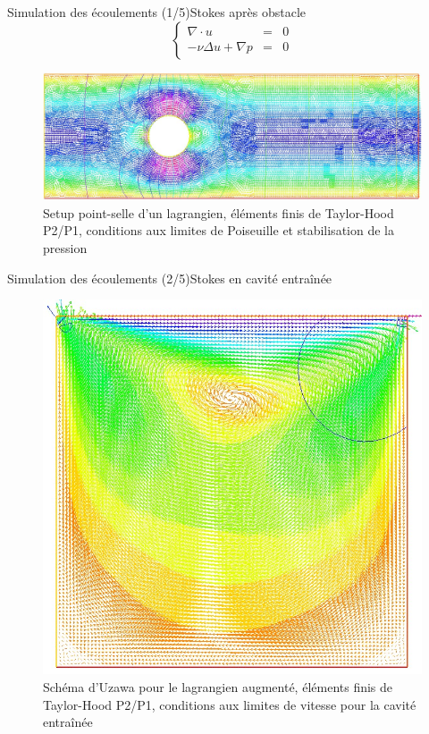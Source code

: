 \documentclass{beamer}
\begin{document}
\begin{frame}{Simulation des écoulements (1/5)}{Stokes après obstacle}
    \begin{equation*}
        \left\{
        \begin{array}{rcl}
        \nabla \cdot u & = & 0 \\
        -\nu \Delta u + \nabla p & = & 0
        \end{array}
        \right.
    \end{equation*}
    \begin{figure}
    \centering
        \includegraphics[width=\textwidth]{images/stokes_obstacle_centre.jpg}
        \caption{Setup point-selle d'un lagrangien, éléments finis de Taylor-Hood P2/P1, conditions aux limites de Poiseuille et stabilisation de la pression}
    \end{figure}
\end{frame}

\begin{frame}{Simulation des écoulements (2/5)}{Stokes en cavité entraînée}
    \begin{figure}
    \centering
        \includegraphics[scale=.30]{images/stokes_cavite_uzawa.jpg}
        \caption{Schéma d'Uzawa pour le lagrangien augmenté, éléments finis de Taylor-Hood P2/P1, conditions aux limites de vitesse pour la cavité entraînée}
    \end{figure}
\end{frame}
\end{document}
